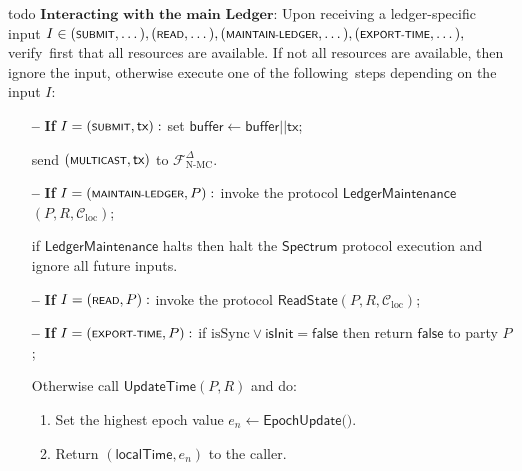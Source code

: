 \begin{protocol}
\begin{algorithmic}
        todo
        \State $\textbf{Interacting with the main Ledger:}$
        Upon receiving a ledger-specific input $I \in (\textsf{\scriptsize{SUBMIT}}, \dots), (\textsf{\scriptsize{READ}}, \dots),
        (\textsf{\scriptsize{MAINTAIN-LEDGER}}, \dots), (\textsf{\scriptsize{EXPORT-TIME}}, \dots),$ verify\
        ﬁrst that all resources are available.
        If not all resources are available, then ignore the input, otherwise execute one of the following\
        steps depending on the input $I$:
        \begin{itemize}
            \item[\textbf{--}] \textbf{If} $I = (\textsf{\scriptsize{SUBMIT}}, \textsf{tx}):$ set $\textsf{buffer} \leftarrow \textsf{buffer} || \textsf{tx}$;
            \item [] send $(\textsf{\scriptsize{MULTICAST}}, \textsf{tx})$ to $\mathcal{F}^{\Delta}_{\text{N-MC}}$.
            \item[\textbf{--}] \textbf{If} $I = (\textsf{\scriptsize{MAINTAIN-LEDGER}}, P):$ invoke the protocol \hyperref[apndx:main-ledger-protocol]{$\textsf{LedgerMaintenance}$}$(P, R, \mathcal{C}_{\text{loc}})$;
            \item[] if $\textsf{LedgerMaintenance}$ halts then halt the $\textsf{Spectrum}$ protocol execution and ignore all future inputs.
            \item[\textbf{--}] \textbf{If} $I = (\textsf{\scriptsize{READ}}, P):$ invoke the protocol \hyperref[apndx:read-state-protocol]{$\textsf{ReadState}$}$(P, R, \mathcal{C}_{\text{loc}})$;
            \item[\textbf{--}] \textbf{If} $I = (\textsf{\scriptsize{EXPORT-TIME}}, P):$ if $\text{isSync} \vee \textsf{isInit} = \textsf{false}$ then return $\textsf{false}$ to party $P$;
            \item[] Otherwise call \hyperref[apndx:update-time-protocol]{$\textsf{UpdateTime}$}$(P, R)$ and do:
            \begin{enumerate}
                \item Set the highest epoch value $e_n \leftarrow \textsf{EpochUpdate()}$.
                \item Return $(\textsf{localTime}, e_n)$ to the caller.
            \end{enumerate}
        \end{itemize}


\end{algorithmic}
\end{protocol}
